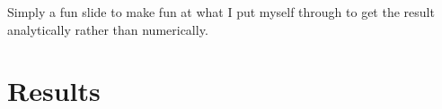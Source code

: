 \documentclass[12pt,a4paper,dvipsnames,usenames]{beamer}
\begin{document}
\begin{frame}[plain]
  \note
  {
    Simply a fun slide to make fun at what I put myself through to get the result analytically rather than numerically.
  }
\end{frame}

\section{Results}

\sectionframe
\end{document}
